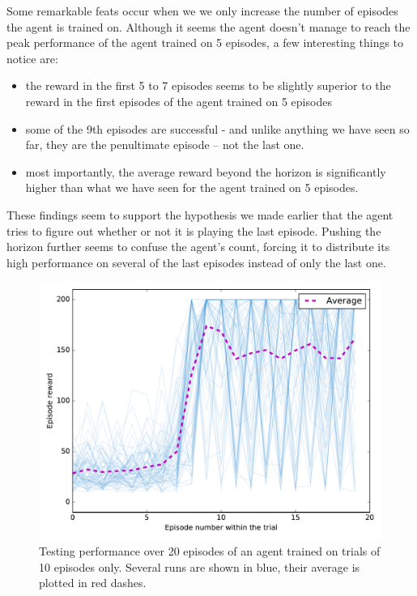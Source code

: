 Some remarkable feats occur when we we only increase the number of episodes the
agent is trained on. Although it seems the agent doesn't manage to reach
the peak performance of the agent trained on 5 episodes, a few interesting
things to notice are:

\begin{itemize}
	\item the reward in the first 5 to 7 episodes seems to be slightly
		superior to the reward in the first episodes of the agent trained
		on 5 episodes
	\item some of the 9th episodes are successful - and unlike anything
		we have seen so far, they are the penultimate episode -- not
		the last one.
	\item most importantly, the average reward beyond the horizon is
		significantly higher than what we have seen for the agent
		trained on 5 episodes.
\end{itemize}

These findings seem to support the hypothesis we made earlier that the agent
tries to figure out whether or not it is playing the last episode. Pushing
the horizon further seems to confuse the agent's count, forcing it 
to distribute its high performance on several of the last episodes instead
of only the last one.\\

\begin{figure}
	\centering
	\includegraphics[width=0.8\linewidth]{fig/horizon_10_3perms.pdf}
	\caption{Testing performance over 20 episodes of an agent trained on 
	trials of 10 episodes only. 
	Several runs are shown in blue, their average is plotted in red dashes.}
	\label{fig:horizon_10_3perms}
\end{figure}


